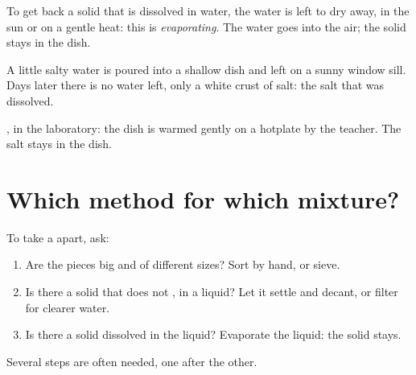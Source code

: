 \begin{definition}[Evaporating]\label{def:g3:separating-mixtures:evaporate}
To get back a solid that is dissolved in water, the water is left to dry
away, in the sun or on a gentle heat: this is
\emph{evaporating}. The water goes into the air; the
solid stays in the dish.
\end{definition}

\begin{example}\label{ex:g3:separating-mixtures:salt}
A little salty water is poured into a shallow dish and left on a sunny
window sill. Days later there is no water left, only a white crust of
salt: the salt that was dissolved.
\end{example}

\begin{omfigure}

{\small {}, in the laboratory: the dish is warmed gently on a
hotplate by the teacher. The salt stays in the dish.}
\end{omfigure}

\section{Which method for which mixture?}

\begin{method}\label{met:g3:separating-mixtures:choose}
To take a  apart, ask:
\begin{enumerate}
  \item Are the pieces big and of different sizes? Sort by hand, or
        sieve.
  \item Is there a solid that does not , in a liquid? Let it
        settle and decant, or filter for clearer water.
  \item Is there a solid dissolved in the liquid? Evaporate the liquid:
        the solid stays.
\end{enumerate}
Several steps are often needed, one after the other.
\end{method}

